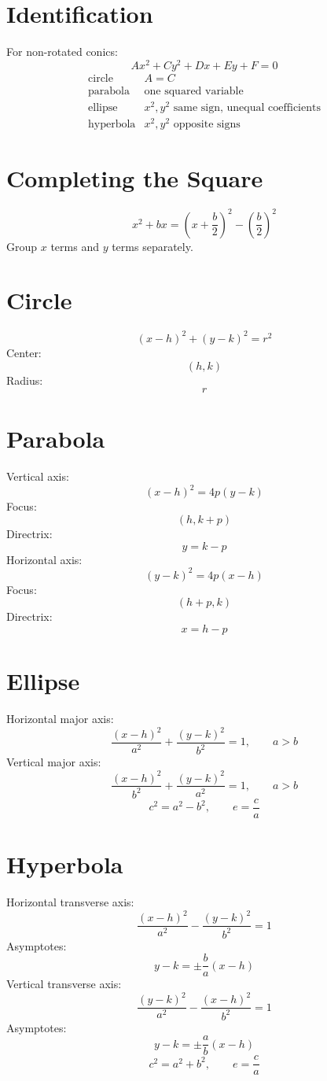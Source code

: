 \documentclass[11pt]{article}
\begin{document}

\section*{Identification}
For non-rotated conics:
\[
Ax^2+Cy^2+Dx+Ey+F=0
\]
\[
\begin{array}{ll}
\text{circle} & A=C\\
\text{parabola} & \text{one squared variable}\\
\text{ellipse} & x^2,y^2\text{ same sign, unequal coefficients}\\
\text{hyperbola} & x^2,y^2\text{ opposite signs}
\end{array}
\]

\section*{Completing the Square}
\[
x^2+bx=\left(x+\frac b2\right)^2-\left(\frac b2\right)^2
\]
Group $x$ terms and $y$ terms separately.

\section*{Circle}
\[
(x-h)^2+(y-k)^2=r^2
\]
Center:
\[
(h,k)
\]
Radius:
\[
r
\]

\section*{Parabola}
Vertical axis:
\[
(x-h)^2=4p(y-k)
\]
Focus:
\[
(h,k+p)
\]
Directrix:
\[
y=k-p
\]
Horizontal axis:
\[
(y-k)^2=4p(x-h)
\]
Focus:
\[
(h+p,k)
\]
Directrix:
\[
x=h-p
\]

\section*{Ellipse}
Horizontal major axis:
\[
\frac{(x-h)^2}{a^2}+\frac{(y-k)^2}{b^2}=1,\qquad a>b
\]
Vertical major axis:
\[
\frac{(x-h)^2}{b^2}+\frac{(y-k)^2}{a^2}=1,\qquad a>b
\]
\[
c^2=a^2-b^2,\qquad e=\frac ca
\]

\section*{Hyperbola}
Horizontal transverse axis:
\[
\frac{(x-h)^2}{a^2}-\frac{(y-k)^2}{b^2}=1
\]
Asymptotes:
\[
y-k=\pm\frac ba(x-h)
\]
Vertical transverse axis:
\[
\frac{(y-k)^2}{a^2}-\frac{(x-h)^2}{b^2}=1
\]
Asymptotes:
\[
y-k=\pm\frac ab(x-h)
\]
\[
c^2=a^2+b^2,\qquad e=\frac ca
\]
\end{document}
